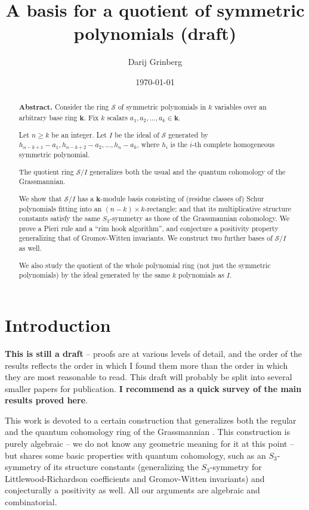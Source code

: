 \documentclass[numbers=enddot,12pt,final,onecolumn,notitlepage]{scrartcl}%
\theoremstyle{definition}
\begin{document}
\title{A basis for a quotient of symmetric polynomials (draft)}
\author{Darij Grinberg}
\date{
\today
}
\maketitle

\begin{abstract}
\textbf{Abstract.} Consider the ring $\mathcal{S}$ of symmetric polynomials in
$k$ variables over an arbitrary base ring $\mathbf{k}$. Fix $k$ scalars
$a_{1},a_{2},\ldots,a_{k}\in\mathbf{k}$.

Let $n\geq k$ be an integer. Let $I$ be the ideal of $\mathcal{S}$ generated
by $h_{n-k+1}-a_{1},h_{n-k+2}-a_{2},\ldots,h_{n}-a_{k}$, where $h_{i}$ is the
$i$-th complete homogeneous symmetric polynomial.

The quotient ring $\mathcal{S}/I$ generalizes both the usual and the quantum
cohomology of the Grassmannian.

We show that $\mathcal{S}/I$ has a $\mathbf{k}$-module basis consisting of
(residue classes of) Schur polynomials fitting into an $\left(  n-k\right)
\times k$-rectangle; and that its multiplicative structure constants satisfy
the same $S_{3}$-symmetry as those of the Grassmannian cohomology. We prove a
Pieri rule and a \textquotedblleft rim hook algorithm\textquotedblright, and
conjecture a positivity property generalizing that of Gromov-Witten
invariants. We construct two further bases of $\mathcal{S}/I$ as well.

We also study the quotient of the whole polynomial ring (not just the
symmetric polynomials) by the ideal generated by the same $k$ polynomials as
$I$.

\end{abstract}
\tableofcontents

\section{Introduction}

\textbf{This is still a draft }-- proofs are at various levels of detail, and
the order of the results reflects the order in which I found them more than
the order in which they are most reasonable to read. This draft will probably
be split into several smaller papers for publication. \textbf{I recommend
\cite{Grinbe19} as a quick survey of the main results proved here}.

This work is devoted to a certain construction that generalizes both the
regular and the quantum cohomology ring of the Grassmannian \cite{Postni05}.
This construction is purely algebraic -- we do not know any geometric meaning
for it at this point -- but shares some basic properties with quantum
cohomology, such as an $S_{3}$-symmetry of its structure constants
(generalizing the $S_{3}$-symmetry for Littlewood-Richardson coefficients and
Gromov-Witten invariants) and conjecturally a positivity as well. All our
arguments are algebraic and combinatorial.
\end{document}

